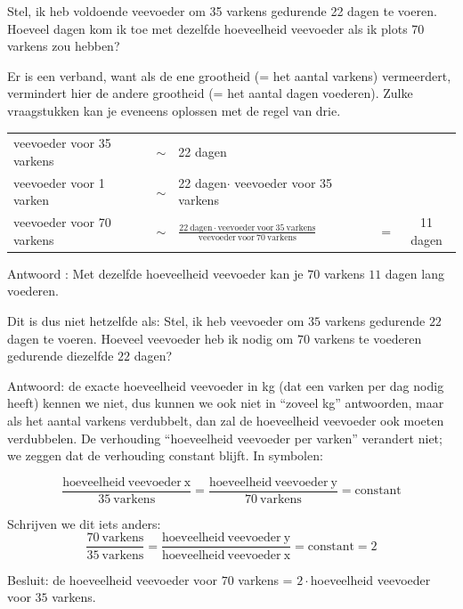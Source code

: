 \begin{voorbeeld}
	Stel, ik heb voldoende veevoeder om 35 varkens gedurende 22 dagen
te voeren. Hoeveel dagen kom ik toe met dezelfde hoeveelheid veevoeder
als ik plots 70 varkens zou hebben?

Er is een verband, want als de ene grootheid (= het aantal varkens)
vermeerdert, vermindert hier de andere grootheid (= het aantal dagen
voederen). Zulke vraagstukken kan je eveneens oplossen met de regel
van drie. 



\begin{tabular}{lclcc}
veevoeder voor 35 varkens & $\sim$ & 22 dagen &  & \\
veevoeder voor 1 varken & $\sim$ & 22 dagen$\cdot$ veevoeder voor 35 varkens &  & \\
veevoeder voor 70 varkens & $\sim$ & $\frac{22\:\mathrm{dagen}\cdot \mathrm{veevoeder\:voor}\:35\:\mathrm{varkens}}{\mathrm{veevoeder\:voor}\:70\:\mathrm{varkens}}$ & = & 11 dagen\\
\end{tabular}

Antwoord : Met dezelfde hoeveelheid veevoeder kan je $70$ varkens $11$
dagen lang voederen. \bigskip{}


Dit is dus niet hetzelfde als: Stel, ik heb veevoeder om $35$ varkens
gedurende $22$ dagen te voeren. Hoeveel veevoeder heb ik nodig om $70$
varkens te voederen gedurende diezelfde $22$ dagen?

Antwoord: de exacte hoeveelheid veevoeder in kg (dat een varken per
dag nodig heeft) kennen we niet, dus kunnen we ook niet in ``zoveel
kg'' antwoorden, maar als het aantal varkens verdubbelt, dan zal
de hoeveelheid veevoeder ook moeten verdubbelen. De verhouding ``hoeveelheid
veevoeder per varken'' verandert niet; we zeggen dat de verhouding
constant blijft. In symbolen:

\begin{equation*}
\frac{\mathrm{hoeveelheid\:veevoeder\:x}}{35\:\mathrm{varkens}}=\frac{\mathrm{hoeveelheid\:veevoeder\:y}}{70\:\mathrm{varkens}}=\text{constant}
\end{equation*}

Schrijven we dit iets anders: 
\begin{equation*}
\frac{70\:\mathrm{varkens}}{35\:\mathrm{varkens}}=\frac{\mathrm{hoeveelheid\:veevoeder\:y}}{\mathrm{hoeveelheid\:veevoeder\:x}}=\text{constant}=2
\end{equation*}

Besluit: de hoeveelheid veevoeder voor $70$ varkens = $2\cdot$hoeveelheid
veevoeder voor $35$ varkens.

\end{voorbeeld}

